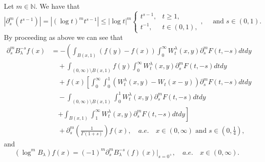 \documentclass[a4paper,10pt, reqno]{amsart}
\theoremstyle{definition}
\theoremstyle{remark}
\numberwithin{equation}{section}
\begin{document}
Let $m\in \mathbb N$. We have that
\[
|\partial_s^m (t^{s-1})|=|(\log t)^m t^{s-1}|\leq |\log t|^m\left\{\begin{array}{ll}
t^{s-1},&t\geq 1,\\
t^{-1},&t\in (0,1),
\end{array}
\right.,\quad \mbox{ and }s\in (0,1).
\]
By proceeding as above we can see that
\begin{align*}
    \partial_s^m B_\lambda^{-s}f(x)&=-\left(\int_{B(x,1)}(f(y)-f(x))\int_0^\infty W_t^\lambda (x,y)\partial_s^m F(t,-s)dtdy\right.\\
    &\quad +\int_{(0,\infty)\setminus B(x,1)}f(y)\int_0^\infty W_t^\lambda (x,y)\partial_s^m F(t,-s)dtdy\\
    &\quad +f(x)\left[\int_0^\infty\int_0^1(W_t^\lambda (x,y)-W_t(x-y))\partial_s^m F(t,-s)dtdy\right.\\
    &\quad -\int_{(0, \infty)\setminus B(x,1)}\int_0^1 W_t^\lambda (x,y)\partial_s^m F(t,-s)dtdy\\
    &\quad \left.+\int_{B(x,1)}\int_1^\infty W_t^\lambda (x,y)\partial_s^m F(t,-s)dtdy\right]\\
    &\quad +\partial_s^m \left(\frac{1}{\Gamma (1+s)}\right)f(x),\quad a.e.\quad  x\in (0,\infty)\mbox{ and }s\in \left(0,\tfrac{1}{4}\right),
\end{align*}
and
\begin{equation}\label{eq: representation log^m negative s}
(\log^m B_\lambda)f(x)=(-1)^m\partial_s^m B_\lambda^{-s}(f)(x)\Big|_{s=0^+},\quad a.e.\quad x\in (0,\infty).    
\end{equation}
\end{document}
